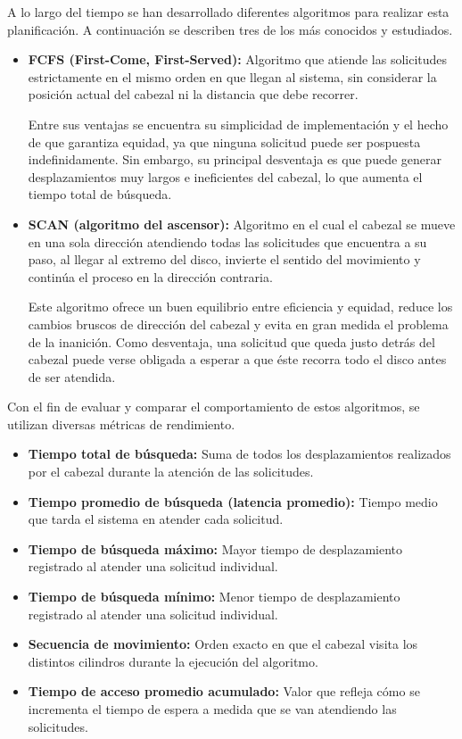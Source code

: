 \documentclass[14pt,letterpaper]{extarticle}
\begin{document}
A lo largo del tiempo se han desarrollado diferentes algoritmos para realizar esta planificación. A continuación se describen tres de los más conocidos y estudiados.

\begin{itemize}
    \item \textbf{FCFS (First-Come, First-Served):} Algoritmo que atiende las solicitudes estrictamente en el mismo orden en que llegan al sistema, sin considerar la posición actual del cabezal ni la distancia que debe recorrer.
    
    
    \qquad Entre sus ventajas se encuentra su simplicidad de implementación y el   hecho de que garantiza equidad, ya que ninguna solicitud puede ser pospuesta indefinidamente. Sin embargo, su principal desventaja es que puede generar desplazamientos muy largos e ineficientes del cabezal, lo que aumenta el tiempo total de búsqueda.
\end{itemize}

\begin{itemize}
    \item \textbf{SCAN (algoritmo del ascensor):} Algoritmo en el cual el cabezal se mueve en una sola dirección atendiendo todas las solicitudes que encuentra a su paso, al llegar al extremo del disco, invierte el sentido del movimiento y continúa el proceso en la dirección contraria.

    \qquad Este algoritmo ofrece un buen equilibrio entre eficiencia y equidad, reduce los cambios bruscos de dirección del cabezal y evita en gran medida el problema de la inanición. Como desventaja, una solicitud que queda justo detrás del cabezal puede verse obligada a esperar a que éste recorra todo el disco antes de ser atendida.
\end{itemize}


Con el fin de evaluar y comparar el comportamiento de estos algoritmos, se utilizan diversas métricas de rendimiento.

\begin{itemize}
    \item \textbf{Tiempo total de búsqueda:} Suma de todos los desplazamientos realizados por el cabezal durante la atención de las solicitudes.
    \item \textbf{Tiempo promedio de búsqueda (latencia promedio):} Tiempo medio que tarda el sistema en atender cada solicitud.
    \item \textbf{Tiempo de búsqueda máximo:} Mayor tiempo de desplazamiento registrado al atender una solicitud individual.
    \item \textbf{Tiempo de búsqueda mínimo:} Menor tiempo de desplazamiento registrado al atender una solicitud individual.
    \item \textbf{Secuencia de movimiento:} Orden exacto en que el cabezal visita los distintos cilindros durante la ejecución del algoritmo.
    \item \textbf{Tiempo de acceso promedio acumulado:} Valor que refleja cómo se incrementa el tiempo de espera a medida que se van atendiendo las solicitudes.
\end{itemize}
\end{document}
